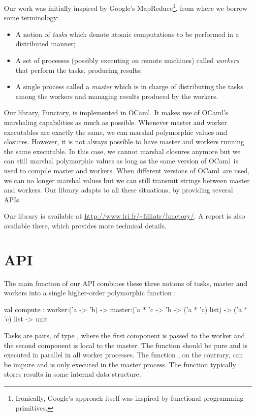 \documentclass[preprint]{sigplanconf}
\newcommand{\Ocaml}{OCaml}
\newcommand{\functory}{\textsf{Functory}}
\begin{document}
Our work was initially inspired by Google's
MapReduce\footnote{Ironically, Google's approach itself was inspired
  by functional programming primitives.}, from where we borrow some 
terminology:
\begin{itemize}
\item A notion of \emph{tasks} which denote atomic computations
  to be performed in a distributed manner; 
\item A set of processes (possibly executing on remote machines)
  called \emph{workers} that perform
  the tasks, producing results;
\item A single process called a \emph{master} which is in charge
  of distributing the tasks among the workers and managing results
  produced by the workers.
\end{itemize}

Our library, \functory, is implemented in \Ocaml.
It makes use of \Ocaml's marshaling capabilities as much as
possible. Whenever master and worker executables are exactly the same,
we can marshal polymorphic values and closures. However, it is not
always possible to have master and workers running the same
executable. In this case, we cannot marshal closures anymore but we
can still marshal polymorphic values as long as the same version of
\Ocaml\ is used to compile master and workers. When different versions
of \Ocaml\ are used, we can no longer marshal values but we can still
transmit strings between master and workers. Our library adapts to all
these situations, by providing several APIs.


Our library is available
at \url{http://www.lri.fr/~filliatr/functory/}.
A report is also available there, which provides more
technical details. 

\section{API}\label{sec:API}

The main function of our API combines these three notions of tasks,
master and workers into a single higher-order polymorphic function
:
\begin{ocaml}
  val compute : 
    worker:('a -> 'b) -> 
    master:('a * 'c -> 'b -> ('a * 'c) list) -> 
    ('a * 'c) list -> unit
\end{ocaml}
Tasks are pairs, of type , where the first component is
passed to the worker and the second component is local to the master.
The  function should be pure and is executed in parallel
in all worker processes. The function , on the
contrary, can be impure and is only executed in the master process.
The  function typically stores results 
in some internal data structure.
\end{document}
